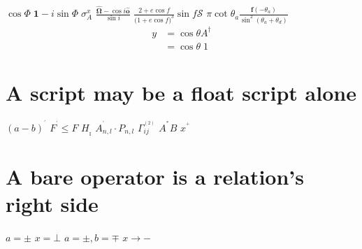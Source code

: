 \documentclass{article}
\begin{document}
$\cos\Phi\;\mathbf{1}-i\sin\Phi\;\sigma^{x}_{A}$ $\frac{\mathbf{\hat{\Omega}}-\cos i\mathbf{\hat{o}}}{\sin i}$
$\frac{2+e\cos f}{\big(1+e\cos f\big)^{3}}\sin f\mathcal{S}$ $\pi\cot{\theta_{a}}\frac{\mathbf{f}(-\theta_{a})}{\sin^{2}{(\theta_{a}+\theta_{d})}}$
\begin{equation}\begin{split}y&=\cos\theta A^\dagger\\&=\cos\theta\;1\end{split}\end{equation}

\section{A script may be a float script alone}
$(a-b)^{{}^{\prime}}$ $F^{{}^{\prime}}\leq F$ $H_{{}_{\mathrm{I}}}$ $A_{n,l}^{{}^{\prime}}\cdot P_{n,l}$
$\Gamma^{{}^{(2)}}_{ij}$ $A^{{}^{\ast}}B$ $x^{{}^{+}}$

\section{A bare operator is a relation's right side}
$a=\pm$ $x=\bot$ $a=\pm,b=\mp$ $x\to-$

\end{document}
